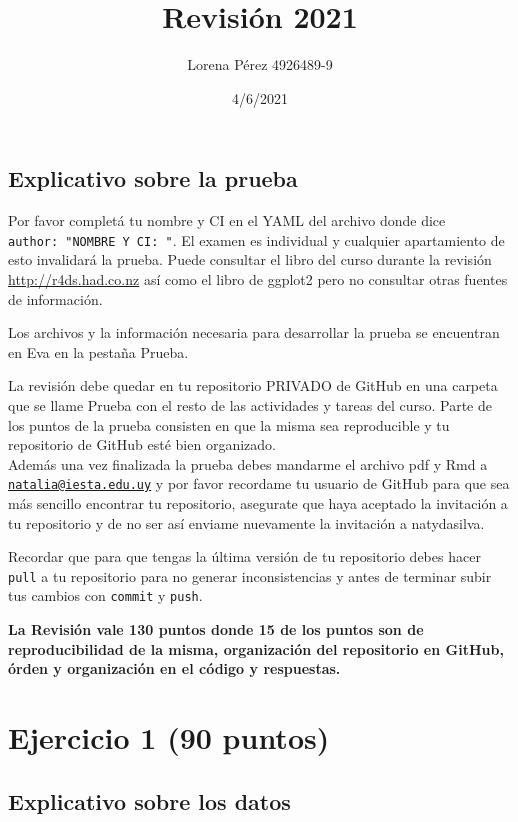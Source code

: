 \documentclass[
]{article}
\title{Revisión 2021}
\author{Lorena Pérez 4926489-9}
\date{4/6/2021}
\begin{document}
\maketitle

\hypertarget{explicativo-sobre-la-prueba}{%
\subsection{Explicativo sobre la
prueba}\label{explicativo-sobre-la-prueba}}

Por favor completá tu nombre y CI en el YAML del archivo donde dice
\texttt{author:\ "NOMBRE\ Y\ CI:\ "}. El examen es individual y
cualquier apartamiento de esto invalidará la prueba. Puede consultar el
libro del curso durante la revisión \url{http://r4ds.had.co.nz} así como
el libro de ggplot2 pero no consultar otras fuentes de información.

Los archivos y la información necesaria para desarrollar la prueba se
encuentran en Eva en la pestaña Prueba.

La revisión debe quedar en tu repositorio PRIVADO de GitHub en una
carpeta que se llame Prueba con el resto de las actividades y tareas del
curso. Parte de los puntos de la prueba consisten en que la misma sea
reproducible y tu repositorio de GitHub esté bien organizado.\\
Además una vez finalizada la prueba debes mandarme el archivo pdf y Rmd
a \href{mailto:natalia@iesta.edu.uy}{\nolinkurl{natalia@iesta.edu.uy}} y
por favor recordame tu usuario de GitHub para que sea más sencillo
encontrar tu repositorio, asegurate que haya aceptado la invitación a tu
repositorio y de no ser así enviame nuevamente la invitación a
natydasilva.

Recordar que para que tengas la última versión de tu repositorio debes
hacer \texttt{pull} a tu repositorio para no generar inconsistencias y
antes de terminar subir tus cambios con \texttt{commit} y \texttt{push}.

\textbf{La Revisión vale 130 puntos donde 15 de los puntos son de
reproducibilidad de la misma, organización del repositorio en GitHub,
órden y organización en el código y respuestas.}

\hypertarget{ejercicio-1-90-puntos}{%
\section{Ejercicio 1 (90 puntos)}\label{ejercicio-1-90-puntos}}

\hypertarget{explicativo-sobre-los-datos}{%
\subsection{Explicativo sobre los
datos}\label{explicativo-sobre-los-datos}}
\end{document}
